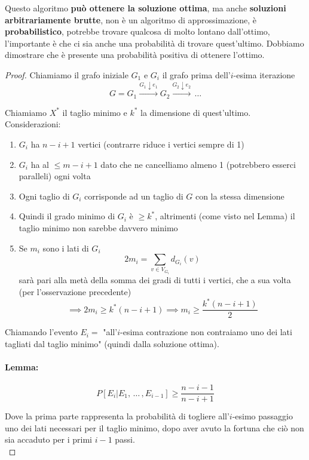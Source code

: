 Questo algoritmo \textbf{può ottenere la soluzione ottima}, ma anche \textbf{soluzioni arbitrariamente brutte}, non è un algoritmo di approssimazione, è \textbf{probabilistico}, potrebbe trovare qualcosa di molto lontano dall'ottimo, l'importante è che ci sia anche una probabilità di trovare quest'ultimo. Dobbiamo dimostrare che è presente una probabilità positiva di ottenere l'ottimo.\\

\begin{proof}
	Chiamiamo il grafo iniziale $G_1$ e $G_i$ il grafo prima dell'$i$-esima iterazione
	$$ G = G_1 \xrightarrow{G_1 \downarrow e_1} G_2 \xrightarrow{G_2 \downarrow e_2} \, \dots $$
	
	Chiamiamo $X^\ast$ il taglio minimo e $k^\ast$ la dimensione di quest'ultimo.\\
	
	Considerazioni:
	\begin{enumerate}
		\item $G_i$ ha $n-i+1$ vertici (contrarre riduce i vertici sempre di 1)
		\item $G_i$ ha al $\leq m -i+1$ dato che ne cancelliamo almeno 1 (potrebbero esserci paralleli) ogni volta
		\item Ogni taglio di $G_i$ corrisponde ad un taglio di $G$ con la stessa dimensione
		\item Quindi il grado minimo di $G_i$ è $\geq k^\ast$, altrimenti (come visto nel Lemma) il taglio minimo non sarebbe davvero minimo
		\item Se $m_i$ sono i lati di $G_i$
		$$ 2 m_i = \sum_{v \in V_{G_i}} d_{G_i} (v)$$
		sarà pari alla metà della somma dei gradi di tutti i vertici, che a sua volta (per l'osservazione precedente)
		$$ \implies 2m_i \geq k^\ast (n-i+1) \implies m_i \geq \frac{k^\ast (n-i+1)}{2} $$
	\end{enumerate}
	
	Chiamando l'evento $E_i =$ "all'$i$-esima contrazione non contraiamo uno dei lati tagliati dal taglio minimo" (quindi dalla soluzione ottima).\\
	
	\newpage
	
	\paragraph{Lemma: }
	$$P[E_i | E_1, \, \dots \, , E_{i-1}] \geq \frac{n-i-1}{n-i+1}$$
	
	Dove la prima parte rappresenta la probabilità di togliere all'$i$-esimo passaggio uno dei lati necessari per il taglio minimo, dopo aver avuto la fortuna che ciò non sia accaduto per i primi $i-1$ passi.\\
	

\end{proof}
